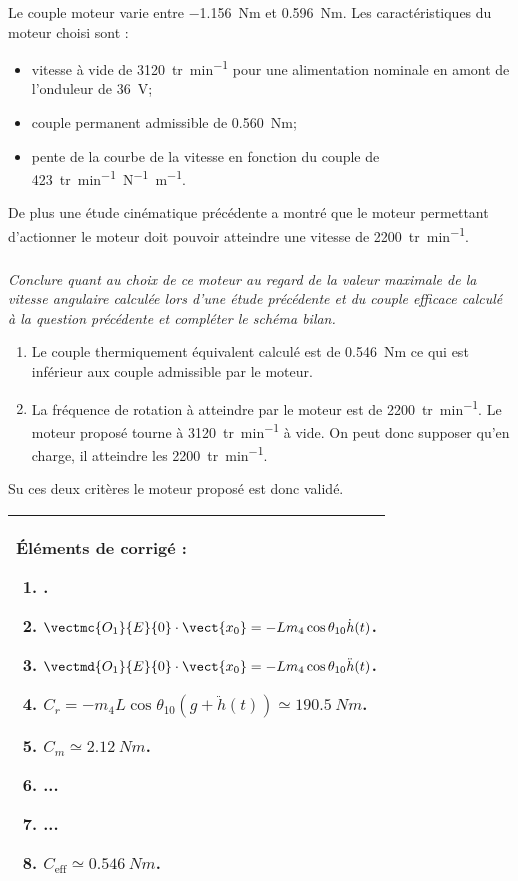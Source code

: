 \begin{multicols}{2}
Le couple moteur varie entre \SI{-1,156}{Nm} et \SI{0,596}{Nm}.
Les caractéristiques du moteur choisi sont :
\begin{itemize}
\item vitesse à vide de \SI{3120}{tr.min^{-1}} pour une alimentation nominale en amont de l’onduleur de \SI{36}{V};
\item couple permanent admissible de \SI{0,560}{Nm};
\item pente de la courbe de la vitesse en fonction du couple de \SI{423}{tr.min^{-1}N^{-1}m^{-1}}.
\end{itemize}

De plus une étude cinématique précédente a montré que le moteur permettant d'actionner le moteur doit pouvoir atteindre une vitesse de \SI{2200}{tr.min^{-1}}.

\fi


\subparagraph{} \textit{Conclure quant au choix de ce moteur au regard de la valeur maximale de la vitesse angulaire calculée lors d'une étude précédente et du couple efficace calculé à la question précédente et compléter le schéma bilan.}

\ifprof
\begin{corrige}
\begin{enumerate}
\item Le couple thermiquement équivalent calculé est de \SI{0,546}{Nm} ce qui est inférieur aux couple admissible par le moteur. 
\item La fréquence de rotation à atteindre par le moteur est de \SI{2200}{tr.min^{-1}}. Le moteur proposé tourne à \SI{3120}{tr.min^{-1}} à vide. On peut donc supposer qu'en charge, il atteindre les \SI{2200}{tr.min^{-1}}.
\end{enumerate}
Su ces deux critères le moteur proposé est donc validé. 
\end{corrige}
\else
\fi

\ifprof
\else

\ifcolle
\else
\noindent 
\footnotesize
\begin{tabular}{|p{.95\linewidth}|}
\hline
Éléments de corrigé :
\begin{enumerate}
\item .
\item $\vectmc{O_1}{E}{0}\cdot \vect{x_0} = -Lm_4\cos\theta_{10}\dot{h}(t)$.
\item $\vectmd{O_1}{E}{0}\cdot\vect{x_0}=-Lm_4\cos\theta_{10}\ddot{h}(t)$.
\item $ C_r=-m_4 L \cos\theta_{10} \left(g+\ddot{h}(t)\right)\simeq \SI{190,5}{Nm} $. 
\item $C_m\simeq \SI{2,12}{Nm}$.
\item ...
\item ...
\item $C_{\text{eff}} \simeq \SI{0,546}{Nm}$.
\end{enumerate} \\
\hline
\end{tabular}
\normalsize
\fi
\fi

\ifprof
\else
\end{multicols}
\fi



